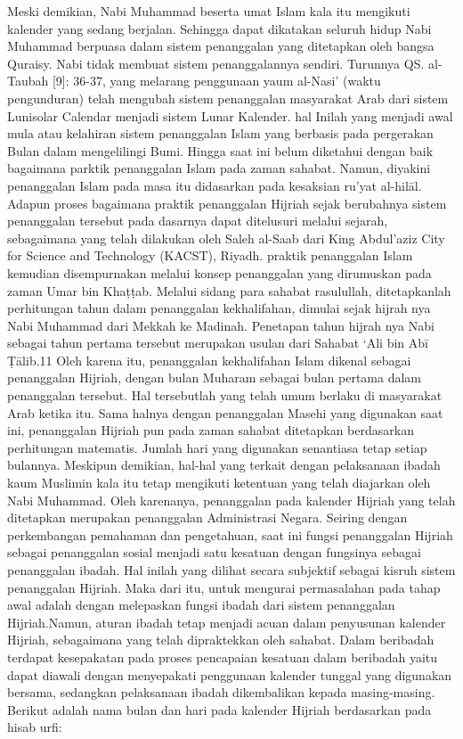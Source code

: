     Meski demikian, Nabi Muhammad beserta umat Islam kala itu mengikuti kalender yang sedang berjalan. Sehingga dapat dikatakan seluruh hidup Nabi Muhammad berpuasa dalam sistem penanggalan yang ditetapkan oleh bangsa Quraisy. Nabi tidak membuat sistem penanggalannya sendiri. Turunnya QS.
    al-Taubah [9]: 36-37, yang melarang penggunaan yaum al-Nasi’ (waktu pengunduran) telah mengubah sistem penanggalan masyarakat Arab dari sistem Lunisolar Calendar menjadi sistem Lunar Kalender. hal Inilah yang menjadi awal mula atau kelahiran sistem penanggalan Islam yang berbasis pada pergerakan Bulan dalam mengelilingi Bumi.
    Hingga saat ini belum diketahui dengan baik bagaimana parktik penanggalan Islam pada zaman sahabat. Namun, diyakini penanggalan Islam pada masa itu didasarkan pada kesaksian ru’yat al-hilāl. Adapun proses bagaimana praktik penanggalan Hijriah sejak berubahnya sistem penanggalan tersebut pada dasarnya dapat ditelusuri melalui sejarah, sebagaimana yang telah dilakukan oleh Saleh al-Saab dari King Abdul’aziz City for Science and Technology (KACST), Riyadh.
    praktik penanggalan Islam kemudian disempurnakan melalui konsep penanggalan yang dirumuskan pada zaman Umar bin Khaṭṭab. Melalui sidang para sahabat rasulullah, ditetapkanlah perhitungan tahun dalam penanggalan kekhalifahan, dimulai sejak hijrah nya Nabi Muhammad dari Mekkah ke Madinah.
    Penetapan tahun hijrah nya Nabi sebagai tahun pertama tersebut merupakan usulan dari Sahabat ‘Ali bin Abī Ṭālib.11 Oleh karena itu, penanggalan kekhalifahan Islam dikenal sebagai penanggalan Hijriah, dengan bulan Muharam sebagai bulan pertama dalam penanggalan tersebut. Hal tersebutlah yang telah umum berlaku di masyarakat Arab ketika itu.
    Sama halnya dengan penanggalan Masehi yang digunakan saat ini, penanggalan Hijriah pun pada zaman sahabat ditetapkan berdasarkan perhitungan matematis. Jumlah hari yang digunakan senantiasa tetap setiap bulannya. Meskipun demikian, hal-hal yang terkait dengan pelaksanaan ibadah kaum Muslimin kala itu tetap mengikuti ketentuan yang telah diajarkan oleh Nabi Muhammad.
    Oleh karenanya, penanggalan pada kalender Hijriah yang telah ditetapkan merupakan penanggalan Administrasi Negara. Seiring dengan perkembangan pemahaman dan pengetahuan, saat ini fungsi penanggalan Hijriah sebagai penanggalan sosial menjadi satu kesatuan dengan fungsinya sebagai penanggalan ibadah. Hal inilah yang dilihat secara subjektif sebagai kisruh sistem penanggalan Hijriah.
    Maka dari itu, untuk mengurai permasalahan pada tahap awal adalah dengan melepaskan fungsi ibadah dari sistem penanggalan Hijriah.Namun, aturan ibadah tetap menjadi acuan dalam penyusunan kalender Hijriah, sebagaimana yang telah dipraktekkan oleh sahabat. Dalam beribadah terdapat kesepakatan pada proses pencapaian kesatuan dalam beribadah yaitu dapat diawali dengan menyepakati penggunaan kalender tunggal yang digunakan bersama, sedangkan pelaksanaan ibadah dikembalikan kepada masing-masing. Berikut adalah nama bulan dan hari pada kalender Hijriah berdasarkan pada hisab urfi:
